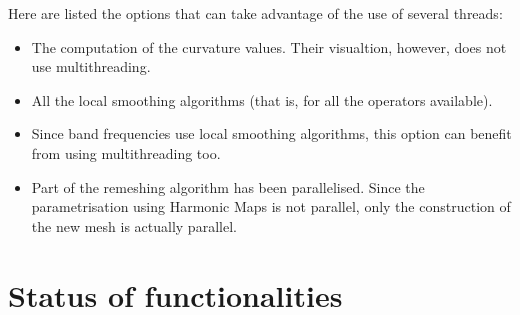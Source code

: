 \documentclass[12pt]{article}
\begin{document}
Here are listed the options that can take advantage of the use of
several threads:
\begin{itemize}
	\item The computation of the curvature values. Their visualtion, however,
	does not use multithreading.
	\item All the local smoothing algorithms (that is, for all the operators
	available).
	\item Since band frequencies use local smoothing algorithms, this
	option can benefit from using multithreading too.
	\item Part of the remeshing algorithm has been parallelised. Since
	the parametrisation using Harmonic Maps is not parallel, only the
	construction of the new mesh is actually parallel.
\end{itemize}

\section{Status of functionalities}
\label{sec:functionalities}
\end{document}
